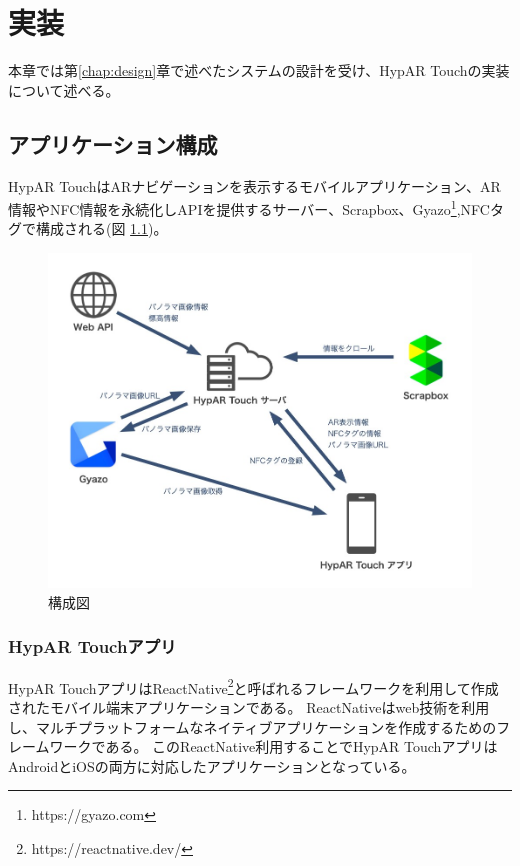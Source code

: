 \chapter{実装}
\label{chap:implementation}

本章では第\ref{chap:design}章で述べたシステムの設計を受け、HypAR Touchの実装について述べる。

\newpage

\section{アプリケーション構成}
HypAR TouchはARナビゲーションを表示するモバイルアプリケーション、AR情報やNFC情報を永続化しAPIを提供するサーバー、Scrapbox、Gyazo\footnote{\textsf{https://gyazo.com}},NFCタグで構成される(図 \ref{fig:application_structure})。

\begin{figure}[h]
  \centering
  \includegraphics[width=150mm]{images/application_structure.jpg}
  \caption{構成図} \label{fig:application_structure}
\end{figure}

\subsection{HypAR Touchアプリ}
HypAR TouchアプリはReactNative\footnote{\textsf{https://reactnative.dev/}}と呼ばれるフレームワークを利用して作成されたモバイル端末アプリケーションである。
ReactNativeはweb技術を利用し、マルチプラットフォームなネイティブアプリケーションを作成するためのフレームワークである。
このReactNative利用することでHypAR TouchアプリはAndroidとiOSの両方に対応したアプリケーションとなっている。

